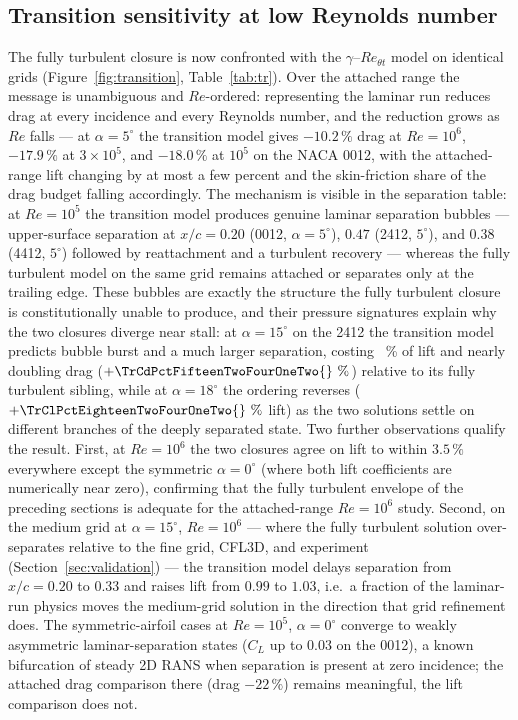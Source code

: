 \documentclass[11pt,a4paper]{article}
\begin{document}
\subsection{Transition sensitivity at low Reynolds number}\label{sec:transition}
The fully turbulent closure is now confronted with the $\gamma$--$Re_{\theta t}$ model on identical grids (Figure~\ref{fig:transition}, Table~\ref{tab:tr}). Over the attached range the message is unambiguous and $Re$-ordered: representing the laminar run reduces drag at every incidence and every Reynolds number, and the reduction grows as $Re$ falls --- at $\alpha = 5^\circ$ the transition model gives $-10.2\,\%$ drag at $Re = 10^6$, $-17.9\,\%$ at $3\times10^5$, and $-18.0\,\%$ at $10^5$ on the NACA 0012, with the attached-range lift changing by at most a few percent and the skin-friction share of the drag budget falling accordingly. The mechanism is visible in the separation table: at $Re = 10^5$ the transition model produces genuine laminar separation bubbles --- upper-surface separation at $x/c = 0.20$ (0012, $\alpha = 5^\circ$), $0.47$ (2412, $5^\circ$), and $0.38$ (4412, $5^\circ$) followed by reattachment and a turbulent recovery --- whereas the fully turbulent model on the same grid remains attached or separates only at the trailing edge. These bubbles are exactly the structure the fully turbulent closure is constitutionally unable to produce, and their pressure signatures explain why the two closures diverge near stall: at $\alpha = 15^\circ$ on the 2412 the transition model predicts bubble burst and a much larger separation, costing \TrClPctFifteenTwoFourOneTwo{}~\% of lift and nearly doubling drag ($+\TrCdPctFifteenTwoFourOneTwo{}~\%$) relative to its fully turbulent sibling, while at $\alpha = 18^\circ$ the ordering reverses ($+\TrClPctEighteenTwoFourOneTwo{}~\%$ lift) as the two solutions settle on different branches of the deeply separated state. Two further observations qualify the result. First, at $Re = 10^6$ the two closures agree on lift to within $3.5\,\%$ everywhere except the symmetric $\alpha = 0^\circ$ (where both lift coefficients are numerically near zero), confirming that the fully turbulent envelope of the preceding sections is adequate for the attached-range $Re = 10^6$ study. Second, on the medium grid at $\alpha = 15^\circ$, $Re = 10^6$ --- where the fully turbulent solution over-separates relative to the fine grid, CFL3D, and experiment (Section~\ref{sec:validation}) --- the transition model delays separation from $x/c = 0.20$ to $0.33$ and raises lift from $0.99$ to $1.03$, i.e.\ a fraction of the laminar-run physics moves the medium-grid solution in the direction that grid refinement does. The symmetric-airfoil cases at $Re = 10^5$, $\alpha = 0^\circ$ converge to weakly asymmetric laminar-separation states ($C_L$ up to $0.03$ on the 0012), a known bifurcation of steady 2D RANS when separation is present at zero incidence; the attached drag comparison there (drag $-22\,\%$) remains meaningful, the lift comparison does not.
\end{document}
